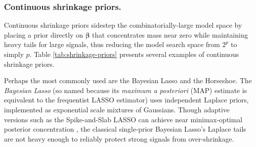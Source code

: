 \subsubsection*{Continuous shrinkage priors.}
Continuous shrinkage priors sidestep the combinatorially-large model space
by placing a prior directly on $\boldsymbol{\beta}$ that
concentrates mass near zero while maintaining heavy tails for large
signals, thus reducing the model search space from $2^p$ to simply $p$. Table \ref{tab:shrinkage-priors} presents several examples of continuous shrinkage priors.


Perhaps the most commonly used are the Bayesian Lasso and the Horseshoe. 
The \emph{Bayesian Lasso} \citep{park_bayesian_2008} (so named because its \textit{maximum a posteriori} (MAP) estimate is equivalent to the frequentist LASSO estimator)
uses independent Laplace priors, implemented as exponential
scale mixtures of Gaussians.  Though adaptive versions such as the Spike-and-Slab LASSO can achieve near minimax-optimal posterior concentration \citep{polson_posterior_2018, bai_efficient_2020}, the classical single-prior Bayesian Lasso's Laplace tails are not heavy
enough to reliably protect strong signals from over-shrinkage.


